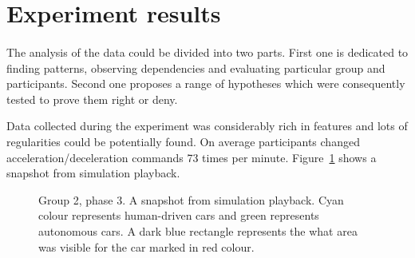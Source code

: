 \documentclass[11pt,english]{article}
\begin{document}
\section{Experiment results}

\paragraph{}

The analysis of the data could be divided into two parts. First one is dedicated to finding patterns, observing dependencies and evaluating particular group and participants. Second one proposes a range of hypotheses which were consequently tested to prove them right or deny. %

\par

Data collected during the experiment was considerably rich in features and lots of regularities could be potentially found. On average participants changed acceleration/deceleration commands 73 times per minute. 
Figure~\ref{fig:sample_snapshot} shows a snapshot from simulation playback.  
 
 
\begin{figure}[h] %
\caption{Group 2, phase 3. A snapshot from simulation playback. Cyan colour represents human-driven cars and green represents autonomous cars. A dark blue rectangle represents the what area was visible for the car marked in red colour.}
\label{fig:sample_snapshot}
\end{figure} 
 
\end{document}
